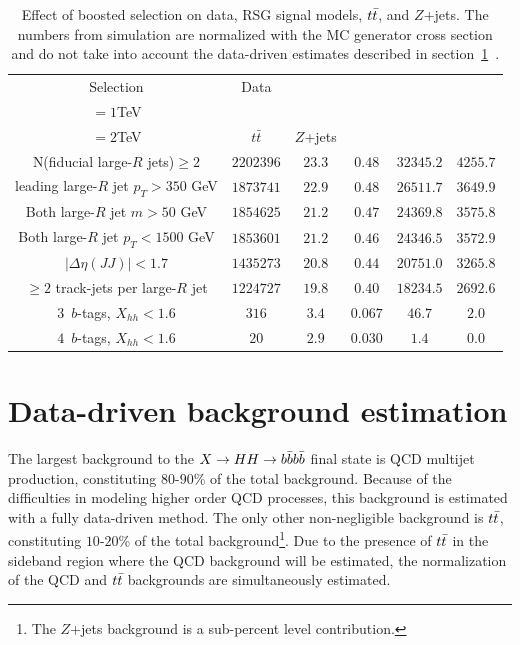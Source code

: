 \begin{table}[h!]
\centering
\captionsetup{justification=centering}

\hspace{-10pt}
\begin{tabular}{c|c|c|c|c|c}
Selection & Data & \specialcell{$m_{\Gkk}$ \\ $=1$TeV} & \specialcell{$m_{\Gkk}$\\ $=2$TeV} & $t\bar{t}$ & $Z$+jets \\
\hline
N(fiducial large-$R$ jets)$\geq 2$ & $2202396$ & $23.3$ & $0.48$ & $32345.2$ & $4255.7$ \\
leading large-$R$ jet $p_{T}>350$ GeV & $1873741$ & $22.9$ & $0.48$ & $26511.7$ & $3649.9$ \\
Both large-$R$ jet $m>50$ GeV & $1854625$ & $21.2$ & $0.47$ & $24369.8$ & $3575.8$ \\
Both large-$R$ jet $p_{T}<1500$ GeV & $1853601$ & $21.2$ & $0.46$ & $24346.5$ & $3572.9$ \\
$|\Delta\eta(JJ)|<1.7$ & $1435273$ & $20.8$ & $0.44$ & $20751.0$ & $3265.8$ \\
$\geq 2$ track-jets per large-$R$ jet & $1224727$ & $19.8$ & $0.40$ & $18234.5$ & $2692.6$ \\
\hline
$3\,$ $b$-tags, $X_{hh}<1.6$ & $316$ & $3.4$ & $0.067$ & $46.7$ & $2.0$ \\
\hline
$4\,$ $b$-tags, $X_{hh}<1.6$ & $20$ & $2.9$ & $0.030$ & $1.4$ & $0.0$ \\
\hline
\end{tabular}

\caption{
Effect of boosted selection on data, RSG signal models, $t\bar{t}$, and $Z$+jets. The numbers from simulation are normalized with the MC generator cross section and do not take into account the data-driven estimates described in section~\ref{sec:dd4b}~\cite{Qi}.
}
\label{tab:4bcutflow}
\end{table}

\section{Data-driven background estimation}
\label{sec:dd4b}

The largest background to the $X\to HH \to b\bar{b}b\bar{b}$ final state is QCD multijet production, constituting $80$-$90$\% of the total background. Because of the difficulties in modeling higher order QCD processes, this background is estimated with a fully data-driven method. The only other non-negligible background is $t\bar{t}$, constituting $10$-$20$\% of the total background\footnote{The $Z$+jets background is a sub-percent level contribution.}.  Due to the presence of $t\bar{t}$ in the sideband region where the QCD background will be estimated, the normalization of the QCD and $t\bar{t}$ backgrounds are simultaneously estimated. 

